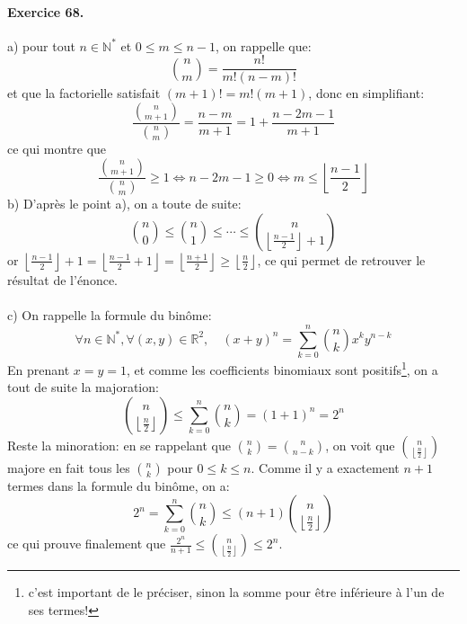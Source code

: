 \paragraph{Exercice 68.} a) pour tout $n\in\mathbb{N}^*$ et $0\leq m \leq n-1$, on rappelle que:
\[
\binom{n}{m} = \frac{n!}{m!(n-m)!}
\]
et que la factorielle satisfait $(m+1)!=m!(m+1)$, donc en simplifiant:
\[
\frac{\binom{n}{m+1} }{\binom{n}{m} } = \frac{n-m}{m+1} = 1+\frac{n-2m-1}{m+1}
\]
ce qui montre que 
\[
\frac{\binom{n}{m+1}}{\binom{n}{m}}  \geq 1 \Leftrightarrow n-2m-1 \geq 0 \Leftrightarrow  m \leq \left\lfloor \frac{n-1}{2} \right\rfloor
\]
b) D’après le point a), on a toute de suite:
\[
\binom{n}{0} \leq \binom{n}{1} \leq \cdots \leq \binom{n}{\left\lfloor \frac{n-1}{2} \right\rfloor+1}
\]
or $\left\lfloor \frac{n-1}{2} \right\rfloor+1 =  \left\lfloor \frac{n-1}{2} +1\right\rfloor = \left\lfloor \frac{n+1}{2} \right\rfloor \geq \left\lfloor \frac{n}{2} \right\rfloor$, ce qui permet de retrouver le résultat de l’énonce.\\ \\
c) On rappelle la formule du binôme: 
\[
\forall n \in \mathbb{N}^*, \forall (x,y)\in\mathbb{R}^2, \quad (x+y)^n=\sum_{k=0}^n{\binom{n}{k}x^ky^{n-k}} 
\]
En prenant $x=y=1$, et comme les coefficients binomiaux sont positifs\footnote{c'est important de le préciser, sinon la somme pour être inférieure à l'un de ses termes!}, on a tout de suite la majoration:
\[
\binom{n}{\left\lfloor \frac{n}{2} \right\rfloor} \leq \sum_{k=0}^n{\binom{n}{k}} = (1+1)^n = 2^n
\]
Reste la minoration: en se rappelant que $\binom{n}{k}=\binom{n}{n-k}$, on voit que $\binom{n}{\left\lfloor \frac{n}{2} \right\rfloor}$ majore en fait tous les $\binom{n}{k}$ pour $0\leq k \leq n$. Comme il y a exactement $n+1$ termes dans la formule du binôme, on a:
\[
2^n = \sum_{k=0}^n{\binom{n}{k}} \leq (n+1)\binom{n}{\left\lfloor \frac{n}{2} \right\rfloor}
\]
ce qui prouve finalement que $\frac{2^n}{n+1}\leq \binom{n}{\left\lfloor \frac{n}{2} \right\rfloor} \leq 2^n $.

